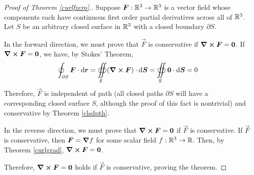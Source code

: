 \begin{proof}[Proof of Theorem \ref{curlfzero}.] Suppose $\boldsymbol{F}: \mathbb{R}^3\to\mathbb{R}^3$ is a vector field whose components each have continuous first order partial derivatives across all of $\mathbb{R}^3$. Let $S$ be an arbitrary closed surface in $\mathbb{R}^3$ with a closed boundary $\partial S$. \par
In the forward direction, we must prove that $\vec F$ is conservative if $\curl \boldsymbol{F} = \boldsymbol{0}$. If $\curl \boldsymbol{F} = \boldsymbol{0}$, we have, by Stokes' Theorem,
\[ \oint_{\partial S}\boldsymbol{F} \cdot \dd \boldsymbol{r} = \oiint\limits_S (\curl \boldsymbol{F}) \cdot \dd \boldsymbol{S} = \oiint\limits_S \boldsymbol{0} \cdot \dd \boldsymbol{S} = 0\]
Therefore, $\vec F$ is independent of path (all closed paths $\partial S$ will have a corresponding closed surface $S$, although the proof of this fact is nontrivial) and conservative by Theorem \ref{clsdpth}. \par
In the reverse direction, we must prove that $\curl \boldsymbol{F} = \boldsymbol{0}$ if $\vec F$ is conservative. If $\vec F$ is conservative, then $\boldsymbol{F} = \grad f$ for some scalar field $f: \mathbb{R}^3\to \mathbb{R}$. Then, by Theorem \ref{curlgrad}, $\curl \boldsymbol{F} = \boldsymbol{0}$. \par
Therefore, $\curl \boldsymbol{F} = \boldsymbol{0}$ holds if $\vec F$ is conservative, proving the theorem.
\end{proof}
